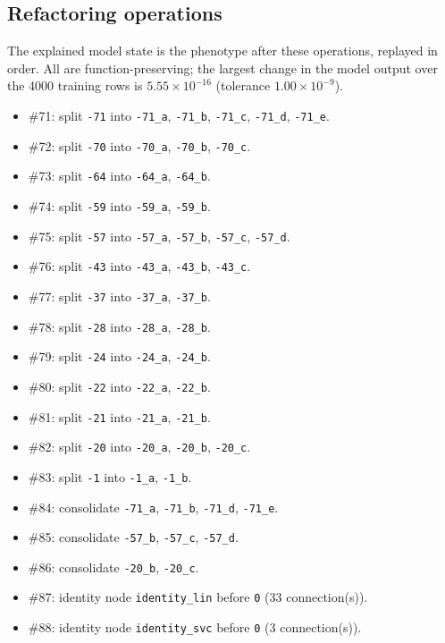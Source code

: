 \begin{drafted}
\subsection{Refactoring operations}\label{app:churn100-s2-c2:operations}
The explained model state is the phenotype after these operations, replayed in order. All are function-preserving; the largest change in the model output over the 4000 training rows is $5.55\times 10^{-16}$ (tolerance $1.00\times 10^{-9}$).
\begin{itemize}
\item \#71: split \texttt{-71} into \texttt{-71\_\allowbreak{}a}, \texttt{-71\_\allowbreak{}b}, \texttt{-71\_\allowbreak{}c}, \texttt{-71\_\allowbreak{}d}, \texttt{-71\_\allowbreak{}e}.
\item \#72: split \texttt{-70} into \texttt{-70\_\allowbreak{}a}, \texttt{-70\_\allowbreak{}b}, \texttt{-70\_\allowbreak{}c}.
\item \#73: split \texttt{-64} into \texttt{-64\_\allowbreak{}a}, \texttt{-64\_\allowbreak{}b}.
\item \#74: split \texttt{-59} into \texttt{-59\_\allowbreak{}a}, \texttt{-59\_\allowbreak{}b}.
\item \#75: split \texttt{-57} into \texttt{-57\_\allowbreak{}a}, \texttt{-57\_\allowbreak{}b}, \texttt{-57\_\allowbreak{}c}, \texttt{-57\_\allowbreak{}d}.
\item \#76: split \texttt{-43} into \texttt{-43\_\allowbreak{}a}, \texttt{-43\_\allowbreak{}b}, \texttt{-43\_\allowbreak{}c}.
\item \#77: split \texttt{-37} into \texttt{-37\_\allowbreak{}a}, \texttt{-37\_\allowbreak{}b}.
\item \#78: split \texttt{-28} into \texttt{-28\_\allowbreak{}a}, \texttt{-28\_\allowbreak{}b}.
\item \#79: split \texttt{-24} into \texttt{-24\_\allowbreak{}a}, \texttt{-24\_\allowbreak{}b}.
\item \#80: split \texttt{-22} into \texttt{-22\_\allowbreak{}a}, \texttt{-22\_\allowbreak{}b}.
\item \#81: split \texttt{-21} into \texttt{-21\_\allowbreak{}a}, \texttt{-21\_\allowbreak{}b}.
\item \#82: split \texttt{-20} into \texttt{-20\_\allowbreak{}a}, \texttt{-20\_\allowbreak{}b}, \texttt{-20\_\allowbreak{}c}.
\item \#83: split \texttt{-1} into \texttt{-1\_\allowbreak{}a}, \texttt{-1\_\allowbreak{}b}.
\item \#84: consolidate \texttt{-71\_\allowbreak{}a}, \texttt{-71\_\allowbreak{}b}, \texttt{-71\_\allowbreak{}d}, \texttt{-71\_\allowbreak{}e}.
\item \#85: consolidate \texttt{-57\_\allowbreak{}b}, \texttt{-57\_\allowbreak{}c}, \texttt{-57\_\allowbreak{}d}.
\item \#86: consolidate \texttt{-20\_\allowbreak{}b}, \texttt{-20\_\allowbreak{}c}.
\item \#87: identity node \texttt{identity\_\allowbreak{}lin} before \texttt{0} (33 connection(s)).
\item \#88: identity node \texttt{identity\_\allowbreak{}svc} before \texttt{0} (3 connection(s)).
\end{itemize}

\end{drafted}

